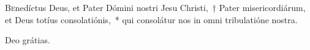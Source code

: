 \lettrine{B}{e}nedíctus Deus, et Pater Dómini nostri Jesu Christi,~† Pater misericordiárum, et Deus totíus consolatiónis,~* qui consolátur nos in omni tribulatióne nostra.

\rr Deo grátias.
